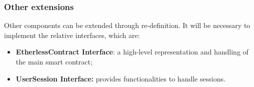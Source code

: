 \subsubsection{Other extensions}
Other components can be extended through re-definition. It will be necessary to implement the relative interfaces, which are:
\begin{itemize}
	\item \textbf{EtherlessContract Interface}: a high-level representation and handling of the main smart contract;
	\item \textbf{UserSession Interface:} provides functionalities to handle sessions.
\end{itemize}